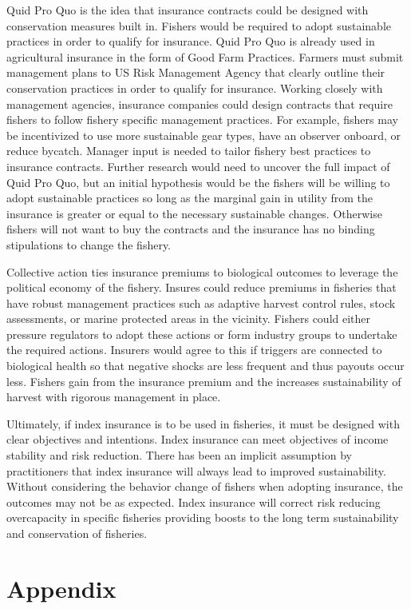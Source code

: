 \documentclass[
  letterpaper,
  DIV=11,
  numbers=noendperiod]{scrartcl}
\theoremstyle{plain}
\theoremstyle{plain}
\theoremstyle{remark}
\begin{document}
Quid Pro Quo is the idea that insurance contracts could be designed with
conservation measures built in. Fishers would be required to adopt
sustainable practices in order to qualify for insurance. Quid Pro Quo is
already used in agricultural insurance in the form of Good Farm
Practices. Farmers must submit management plans to US Risk Management
Agency that clearly outline their conservation practices in order to
qualify for insurance. Working closely with management agencies,
insurance companies could design contracts that require fishers to
follow fishery specific management practices. For example, fishers may
be incentivized to use more sustainable gear types, have an observer
onboard, or reduce bycatch. Manager input is needed to tailor fishery
best practices to insurance contracts. Further research would need to
uncover the full impact of Quid Pro Quo, but an initial hypothesis would
be the fishers will be willing to adopt sustainable practices so long as
the marginal gain in utility from the insurance is greater or equal to
the necessary sustainable changes. Otherwise fishers will not want to
buy the contracts and the insurance has no binding stipulations to
change the fishery.

Collective action ties insurance premiums to biological outcomes to
leverage the political economy of the fishery. Insures could reduce
premiums in fisheries that have robust management practices such as
adaptive harvest control rules, stock assessments, or marine protected
areas in the vicinity. Fishers could either pressure regulators to adopt
these actions or form industry groups to undertake the required actions.
Insurers would agree to this if triggers are connected to biological
health so that negative shocks are less frequent and thus payouts occur
less. Fishers gain from the insurance premium and the increases
sustainability of harvest with rigorous management in place.

Ultimately, if index insurance is to be used in fisheries, it must be
designed with clear objectives and intentions. Index insurance can meet
objectives of income stability and risk reduction. There has been an
implicit assumption by practitioners that index insurance will always
lead to improved sustainability. Without considering the behavior change
of fishers when adopting insurance, the outcomes may not be as expected.
Index insurance will correct risk reducing overcapacity in specific
fisheries providing boosts to the long term sustainability and
conservation of fisheries.

\hypertarget{appendix}{%
\section{Appendix}\label{appendix}}
\end{document}
